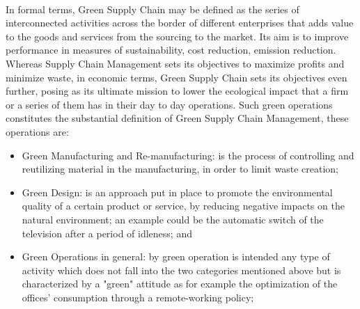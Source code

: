 \begin{doublespace}
\\
In formal terms, Green Supply Chain may be defined as the series of interconnected activities across the border of different enterprises that adds value to the goods and services from the sourcing to the market. Its aim is to improve performance in measures of sustainability, cost reduction, emission reduction. Whereas Supply Chain Management sets its objectives to maximize profits and minimize waste, in economic terms, Green Supply Chain sets its objectives even further, posing as its ultimate mission to lower the ecological impact that a firm or a series of them has in their day to day operations. 
Such green operations\cite{Srivastava2007}\cite{Zhu2008} constitutes the substantial definition of Green Supply Chain Management, these operations are:
  \begin{itemize}
    \item Green Manufacturing and Re-manufacturing: is the process of controlling and reutilizing material in the manufacturing, in order to limit waste creation\cite{Urvashi2013};
    \item Green Design: is an approach put in place to promote the environmental quality of a certain product or service,  by reducing negative impacts on the natural environment; an example could be the automatic switch of the television after a period of idleness\cite{Ceschin2016}; and
    \item Green Operations in general: by green operation is intended any type of activity which does not fall into the two categories mentioned above but is characterized by a "green" attitude as for example the optimization of the offices' consumption through a remote-working policy;
  \end{itemize}
  

\end{doublespace}

